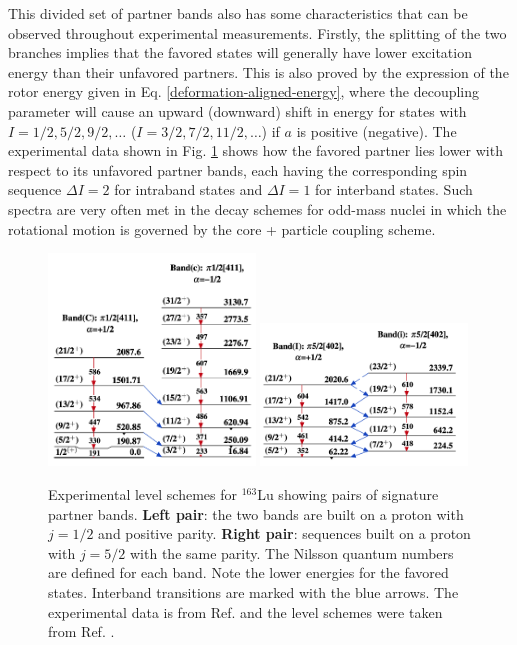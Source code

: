 This divided set of partner bands also has some characteristics that can be observed throughout experimental measurements. Firstly, the splitting of the two branches implies that the favored states will generally have lower excitation energy than their unfavored partners. This is also proved by the expression of the rotor energy given in Eq. \ref{deformation-aligned-energy}, where the decoupling parameter will cause an upward (downward) shift in energy for states with $I=1/2,5/2,9/2,\dots$ ($I=3/2,7/2,11/2,\dots$) if $a$ is positive (negative). The experimental data shown in Fig. \ref{level-scheme-signature-splitting} shows how the favored partner lies lower with respect to its unfavored partner bands, each having the corresponding spin sequence $\Delta I=2$ for intraband states and $\Delta I=1$ for interband states. Such spectra are very often met in the decay schemes for odd-mass nuclei in which the rotational motion is governed by the core + particle coupling scheme.
\begin{figure}
    \centering
    \includegraphics[width=0.49\textwidth]{Chapters/Figures/Lu_163_K12-band.png}
    \includegraphics[width=0.49\textwidth]{Chapters/Figures/Lu_163_signatureSplitting.png}
    \caption{Experimental level schemes for $^{163}$Lu showing pairs of signature partner bands. \textbf{Left pair}: the two bands are built on a proton with $j=1/2$ and positive parity. \textbf{Right pair}: sequences built on a proton with $j=5/2$ with the same parity. The Nilsson quantum numbers are defined for each band. Note the lower energies for the favored states. Interband transitions are marked with the blue arrows. The experimental data is from Ref. \cite{reich2010nuclear} and the level schemes were taken from Ref. \cite{bhat1992evaluated}.}
    \label{level-scheme-signature-splitting}
\end{figure}

